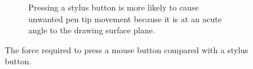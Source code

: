 \begin{figure}
\begin{subfigure}[b]{6.0cm}
    \caption{Pressing a stylus button is more likely to cause unwanted
      pen tip movement because it is at an acute angle to the drawing
      surface plane.}
    \label{fig:button-force-pen} 
  \end{subfigure}
  \caption[Pen vs. Mouse]{The force required to press a mouse button compared with a
    stylus button.}
  \label{fig:button-force}
\end{figure}
